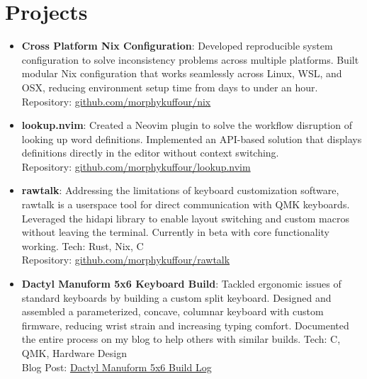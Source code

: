 \documentclass[a4paper,11pt]{article}
\newcommand{\resumeItem}[2]{
  \item\small{
    \textbf{#1}{: #2 \vspace{-2pt}}
  }
}
\newcommand{\resumeSubItem}[2]{\resumeItem{#1}{#2}\vspace{-3pt}}
\begin{document}
\section{Projects}
\vspace{5pt}
\begin{itemize}[leftmargin=0pt, label={}]  %
\resumeSubItem{\textbf{Cross Platform Nix Configuration}}{Developed reproducible system configuration to solve inconsistency problems across multiple platforms. Built modular Nix configuration that works seamlessly across Linux, WSL, and OSX, reducing environment setup time from days to under an hour. \\Repository: \href{https://github.com/morphykuffour/nix.git}{github.com/morphykuffour/nix}}
\vspace{2pt}

\resumeSubItem{\textbf{lookup.nvim}}{Created a Neovim plugin to solve the workflow disruption of looking up word definitions. Implemented an API-based solution that displays definitions directly in the editor without context switching. \\Repository: \href{https://github.com/morphykuffour/lookup.nvim}{github.com/morphykuffour/lookup.nvim}}
\vspace{2pt}

\resumeSubItem{\textbf{rawtalk}}{Addressing the limitations of keyboard customization software, rawtalk is a userspace tool for direct communication with QMK keyboards. Leveraged the hidapi library to enable layout switching and custom macros without leaving the terminal. Currently in beta with core functionality working. Tech: Rust, Nix, C \\Repository: \href{https://github.com/morphykuffour/rawtalk.git}{github.com/morphykuffour/rawtalk}}
\vspace{2pt}

\resumeSubItem{\textbf{Dactyl Manuform 5x6 Keyboard Build}}{Tackled ergonomic issues of standard keyboards by building a custom split keyboard. Designed and assembled a parameterized, concave, columnar keyboard with custom firmware, reducing wrist strain and increasing typing comfort. Documented the entire process on my blog to help others with similar builds. Tech: C, QMK, Hardware Design \\Blog Post: \href{https://morphykuffour.github.io/keyboards,/ergonomics,/qmk/2021/12/29/Dactyl-Manuform.html}{Dactyl Manuform 5x6 Build Log}}
\vspace{2pt}
\end{itemize}
\end{document}
